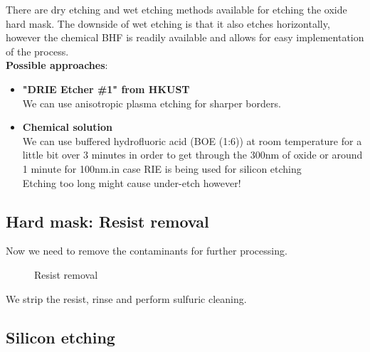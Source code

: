 There are dry etching and wet etching methods available for etching the oxide hard mask. The downside of wet etching is that it also etches horizontally, however the chemical BHF is readily available and allows for easy implementation of the process.\\

\textbf{Possible approaches}:
\begin{itemize}
	\item \textbf{"DRIE Etcher \#1" from HKUST} \\
	We can use anisotropic plasma etching for sharper borders.
	\item \textbf{Chemical solution} \\
	We can use buffered hydrofluoric acid (BOE (1:6)) at room temperature for a little bit over 3 minutes in order to get through the 300nm of oxide or around 1 minute for 100nm.in case RIE is being used for silicon etching\\
	Etching too long might cause under-etch however!
\end{itemize}

\subsection{Hard mask: Resist removal}

Now we need to remove the contaminants for further processing.

\begin{figure}[H]
	\centering
	\begin{tikzpicture}[node distance = 3cm, auto, thick,scale=\CrossSectionOnly, every node/.style={transform shape}]
		
	\end{tikzpicture}
	\drawStepArrow{}
	\begin{tikzpicture}[node distance = 3cm, auto, thick,scale=\CrossSectionOnly, every node/.style={transform shape}]
		
	\end{tikzpicture}
	\caption{Resist removal}
\end{figure}

We strip the resist, rinse and perform sulfuric cleaning.

\newpage

\subsection{Silicon etching}\label{sti_trench_etch}

